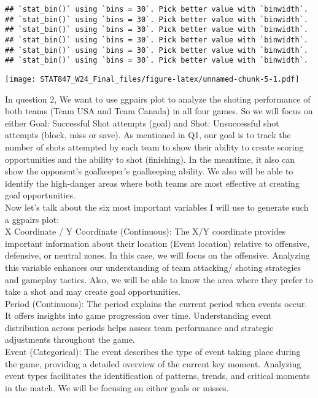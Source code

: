 \documentclass[
  a3paper,
]{article}
\begin{document}
\begin{verbatim}
## `stat_bin()` using `bins = 30`. Pick better value with `binwidth`.
## `stat_bin()` using `bins = 30`. Pick better value with `binwidth`.
## `stat_bin()` using `bins = 30`. Pick better value with `binwidth`.
## `stat_bin()` using `bins = 30`. Pick better value with `binwidth`.
## `stat_bin()` using `bins = 30`. Pick better value with `binwidth`.
## `stat_bin()` using `bins = 30`. Pick better value with `binwidth`.
\end{verbatim}

\texttt{[image: STAT847\_W24\_Final\_files/figure-latex/unnamed-chunk-5-1.pdf]}

In question 2, We want to use ggpairs plot to analyze the shoting
performance of both teams (Team USA and Team Canada) in all four games.
So we will focus on either Goal: Successful Shot attempts (goal) and
Shot: Unsuccessful shot attempts (block, miss or save). As mentioned in
Q1, our goal is to track the number of shots attempted by each team to
show their ability to create scoring opportunities and the ability to
shot (finishing). In the meantime, it also can show the opponent's
goalkeeper's goalkeeping ability. We also will be able to identify the
high-danger areas where both teams are most effective at creating goal
opportunities.\\

Now let's talk about the six most important variables I will use to
generate such a ggpairs plot:\\

X Coordinate / Y Coordinate (Continuous): The X/Y coordinate provides
important information about their location (Event location) relative to
offensive, defensive, or neutral zones. In this case, we will focus on
the offensive. Analyzing this variable enhances our understanding of
team attacking/ shoting strategies and gameplay tactics. Also, we will
be able to know the area where they prefer to take a shot and may create
goal opportunities.\\

Period (Continuous): The period explains the current period when events
occur. It offers insights into game progression over time. Understanding
event distribution across periods helps assess team performance and
strategic adjustments throughout the game.\\

Event (Categorical): The event describes the type of event taking place
during the game, providing a detailed overview of the current key
moment. Analyzing event types facilitates the identification of
patterns, trends, and critical moments in the match. We will be focusing
on either goals or misses.\\
\end{document}
